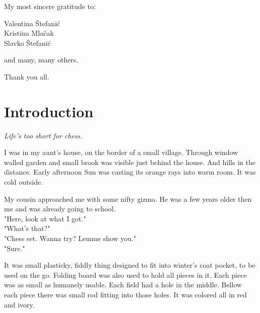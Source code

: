 \documentclass[a5paper,12pt,draft]{book} %
\begin{document}
\thispagestyle{empty}
\vspace*{0.2\textheight}
\begin{flushright}
My most sincere gratitude to:

Valentina Štefanić \\
Kristina Mlačak \\
Slavko Štefanić

and many, many others.

Thank you all.
\end{flushright}
\clearpage

\thispagestyle{empty}
\vspace*{0.1\textheight}
\clearpage

\chapter*{Introduction}

\begin{flushright}
\parbox{0.6\textwidth}{
\emph{Life's too short for chess. \\
 } }
\end{flushright}

I was in my aunt's house, on the border of a small village.
Through window walled garden and small brook was visible just
behind the house. And hills in the distance. Early afternoon Sun
was casting its orange rays into warm room. It was cold outside.

My cousin approached me with some nifty gizmo. He was a
few years older then me and was already going to school. \\
"Here, look at what I got." \\
"What's that?" \\
"Chess set. Wanna try? Lemme show you." \\
"Sure."

It was small plasticky, fiddly thing designed to fit into winter's
coat pocket, to be used on the go. Folding board was also used to
hold all pieces in it. Each piece was as small as humanely usable.
Each field had a hole in the middle. Bellow each piece there was
small rod fitting into those holes. It was colored all in red and ivory.
\end{document}
